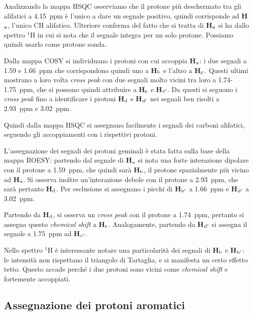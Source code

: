 \documentclass[a4paper, italian, oneside, 12pt]{article}
\begin{document}
Analizzando la mappa HSQC osserviamo che il protone più deschermato tra gli alifatici a 4.15~ppm è l'unico a dare un segnale positivo, quindi corrisponde ad {\bf{H$_{\textrm a}$}}, l'unico CH alifatico. Ulteriore conferma del fatto che si tratta di {\bf{H$_{\textrm a}$}} si ha dallo spettro $^1$H in cui si nota che il segnale integra per un solo protone. Possiamo quindi usarlo come protone sonda.

Dalla mappa COSY si individuano i protoni con cui accoppia {\bf{H$_{\textrm a}$}}: i due segnali a 1.59 e 1.66~ppm che corrispondono quindi uno a {\bf{H$_{\textrm b}$}} e l'altro a {\bf{H$_{b'}$}}. Questi ultimi mostrano a loro volta {\emph{cross peak}} con due segnali molto vicini tra loro a 1.74-1.75~ppm, che si possono quindi attribuire a {\bf{H$_{\textrm c}$}} e {\bf{H$_{\textrm c'}$}}. Da questi si seguono i {\emph{cross peak}} fino a identificare i protoni {\bf{H$_{\textrm d}$}} e {\bf{H$_{\textrm d'}$}} nei segnali ben risolti a 2.93~ppm e 3.02~ppm. 

Quindi dalla mappa HSQC si assegnano facilmente i segnali dei carboni alifatici, seguendo gli accoppiamenti con i rispettivi protoni.

L'assegnazione dei segnali dei protoni geminali è stata fatta sulla base della mappa ROESY: partendo dal segnale di {\bf{H$_{\textrm a}$}} si nota una forte interazione dipolare con il protone a 1.59~ppm, che quindi sarà {\bf{H$_{\textrm b}$}}, il protone spazialmente più vicino ad {\bf{H$_{\textrm a}$}}. Si osserva inoltre un'interazione debole con il protone a 2.93~ppm, che sarà pertanto {\bf{H$_{\textrm d}$}}. Per esclusione si assegnano i picchi di {\bf{H$_{\textrm b'}$}} a 1.66~ppm e {\bf{H$_{\textrm d'}$}} a 3.02~ppm. 

Partendo da {\bf{H$_{\textrm d}$}}, si osserva un {\emph{cross peak}} con il protone a 1.74~ppm, pertanto si assegna questo \emph{chemical shift} a {\bf{H$_{\textrm c}$}}. Analogamente, partendo da {\bf{H$_{\textrm d'}$}} si assegna il segnale a 1.75~ppm ad {\bf{H$_{\textrm c'}$}}.

Nello spettro $^1$H è interessante notare una particolarità dei segnali di {\bf{H$_{\textrm b}$}} e {\bf{H$_{\textrm b'}$}}: le intensità non rispettano il triangolo di Tartaglia, e si manifesta un certo effetto tetto. Questo accade perché i due protoni sono vicini come {\emph{chemical shift}} e fortemente accoppiati.

\subsection{Assegnazione dei protoni aromatici}
\end{document}
